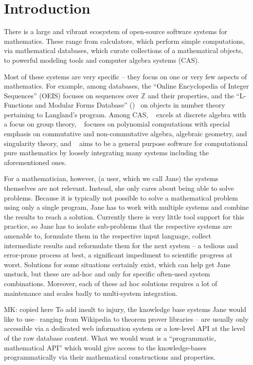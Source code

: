 \section{Introduction}\label{sec:intro}

There is a large and vibrant ecosystem of open-source software systems for mathematics. 
These range from calculators, which perform simple computations, via mathematical databases, which curate collections of a mathematical objects, to powerful modeling tools and computer algebra systems (CAS).

Most of these systems are very specific -- they focus on one or very few aspects of mathematics.
For example, among databases, the ``Online Encyclopedia of Integer Sequences'' (OEIS) focuses on sequences over $\mathbb{Z}$ and their properties, and the ``L-Functions and Modular Forms
Database'' (\LMFDB)~\cite{Cremona:LMFDB16,lmfdb:on} on objects in number theory pertaining to Langland's program.
 Among CAS, \GAP~\cite{GAP:on} excels at discrete algebra with a focus on group theory, \Singular~\cite{singular:on} focuses on polynomial computations with special emphasis on commutative and non-commutative algebra, algebraic geometry, and singularity theory, and \Sage~\cite{SageMath:on} aims to be a general purpose software for computational pure mathematics by loosely integrating many systems including the aforementioned ones.

For a mathematician, however, (a user, which we call Jane) the systems themselves are not relevant.
Instead, she only cares about being able to solve problems. 
Because it is typically not possible to solve a mathematical problem using only a single program, Jane has to work with multiple systems and combine the results to reach a solution. 
Currently there is very little tool support for this practice, so Jane has to isolate sub-problems that the respective systems are amenable to, formulate them in the respective input language, collect intermediate results and reformulate them for the next system -- a tedious and error-prone process at best, a significant impediment to scientific progress at worst.
Solutions for some situations certainly exist, which can help get Jane unstuck, but these are ad-hoc and only for specific often-used system combinations. 
Moreover, each of these ad hoc solutions requires a lot of maintenance and scales badly to
multi-system integration.
\begin{newpart}{MK: copied here}
  To add insult to injury, the knowledge base systems Jane would like to use-- ranging from Wikipedia to theorem prover libraries -- are usually only accessible via a dedicated web information system or a low-level API at the level of the raw database content.  
What we would want is a ``programmatic, mathematical API'' which would give access to the knowledge-bases programmatically via their mathematical constructions and properties.
\end{newpart}


